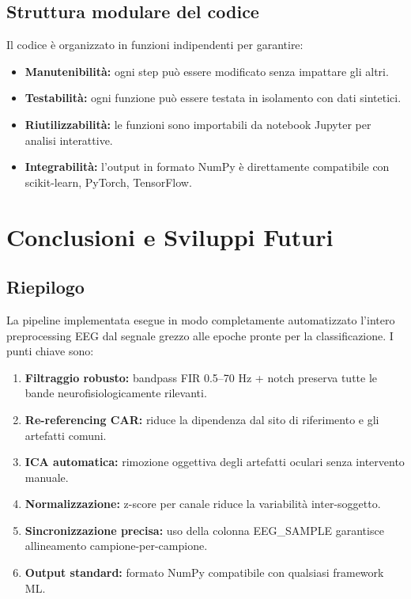 \documentclass[12pt, a4paper]{article}
\begin{document}
\subsection{Struttura modulare del codice}

Il codice è organizzato in funzioni indipendenti per garantire:
\begin{itemize}
    \item \textbf{Manutenibilità:} ogni step può essere modificato senza impattare gli altri.
    \item \textbf{Testabilità:} ogni funzione può essere testata in isolamento con dati sintetici.
    \item \textbf{Riutilizzabilità:} le funzioni sono importabili da notebook Jupyter per analisi interattive.
    \item \textbf{Integrabilità:} l'output in formato NumPy è direttamente compatibile con scikit-learn, PyTorch, TensorFlow.
\end{itemize}

\section{Conclusioni e Sviluppi Futuri}

\subsection{Riepilogo}

La pipeline implementata esegue in modo completamente automatizzato l'intero preprocessing EEG dal segnale grezzo alle epoche pronte per la classificazione. I punti chiave sono:

\begin{enumerate}
    \item \textbf{Filtraggio robusto:} bandpass FIR 0.5--70 Hz + notch preserva tutte le bande neurofisiologicamente rilevanti.
    \item \textbf{Re-referencing CAR:} riduce la dipendenza dal sito di riferimento e gli artefatti comuni.
    \item \textbf{ICA automatica:} rimozione oggettiva degli artefatti oculari senza intervento manuale.
    \item \textbf{Normalizzazione:} z-score per canale riduce la variabilità inter-soggetto.
    \item \textbf{Sincronizzazione precisa:} uso della colonna EEG\_SAMPLE garantisce allineamento campione-per-campione.
    \item \textbf{Output standard:} formato NumPy compatibile con qualsiasi framework ML.
\end{enumerate}
\end{document}
